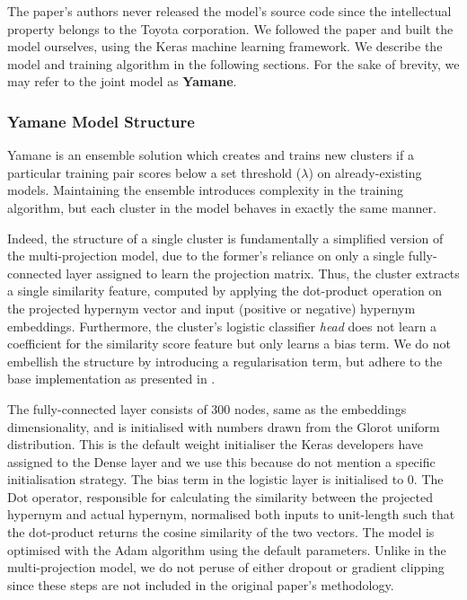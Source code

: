 The paper's authors never released the model's source code since the intellectual property belongs to the Toyota corporation.  We followed the paper and built the model ourselves, using the Keras machine learning framework.  We describe the model and training algorithm in the following sections.  For the sake of brevity, we may refer to the joint model as \textbf{Yamane}.

\subsubsection{Yamane Model Structure} \label{yamane_model_structure}
Yamane is an ensemble solution which creates and trains new clusters if a particular training pair scores below a set threshold ($\lambda$) on already-existing models.  Maintaining the ensemble introduces complexity in the training algorithm, but each cluster in the model behaves in exactly the same manner.  

Indeed, the structure of a single cluster is fundamentally a simplified version of the multi-projection model, due to the former's reliance on only a single fully-connected layer assigned to learn the projection matrix.  Thus, the cluster extracts a single similarity feature, computed by applying the dot-product operation on the projected hypernym vector and input (positive or negative) hypernym embeddings.  Furthermore, the cluster's logistic classifier \textit{head} does not learn a coefficient for the similarity score feature but only learns a bias term.  We do not embellish the structure by introducing a regularisation term, but adhere to the base implementation as presented in \citep{yamane2016distributional}.

The fully-connected layer consists of 300 nodes, same as the embeddings dimensionality, and is initialised with numbers drawn from the Glorot uniform distribution.  This is the default weight initialiser the Keras developers have assigned to the Dense layer and we use this because \citet{yamane2016distributional} do not mention a specific initialisation strategy.  The bias term in the logistic layer is initialised to 0.  The Dot operator, responsible for calculating the similarity between the projected hypernym and actual hypernym, normalised both inputs to unit-length such that the dot-product returns the cosine similarity of the two vectors.  The model is optimised with the Adam algorithm \citep{kingma2014adam} using the default parameters.  Unlike in the multi-projection model, we do not peruse of either dropout or gradient clipping since these steps are not included in the original paper's methodology.

